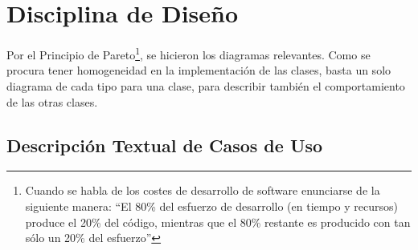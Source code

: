 
\chapter{Disciplina de Diseño}
\label{chap:disenio}

Por el Principio de Pareto\footnote{Cuando se habla de los costes de desarrollo de software enunciarse de la siguiente manera: ``El 80\% del esfuerzo de desarrollo (en tiempo y recursos) produce el 20\% del código, mientras que el 80\% restante es producido con tan sólo un 20\% del esfuerzo''}, se hicieron los diagramas relevantes. Como se procura tener homogeneidad en la implementación de las clases, basta un solo diagrama de cada tipo para una clase, para describir también el comportamiento de las otras clases.

\section{Descripción Textual de Casos de Uso}


